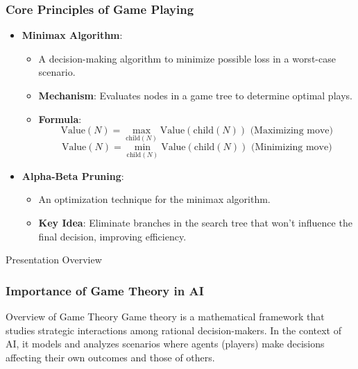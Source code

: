 \documentclass[aspectratio=169]{beamer}
\begin{document}
\begin{frame}[fragile]
    \frametitle{Core Principles of Game Playing}
    \begin{itemize}
        \item \textbf{Minimax Algorithm}:
            \begin{itemize}
                \item A decision-making algorithm to minimize possible loss in a worst-case scenario.
                \item \textbf{Mechanism}: Evaluates nodes in a game tree to determine optimal plays.
                \item \textbf{Formula}:
                \begin{equation}
                \text{Value}(N) = \max_{\text{child}(N)} \text{Value}(\text{child}(N)) \text{ (Maximizing move)}
                \end{equation}
                \begin{equation}
                \text{Value}(N) = \min_{\text{child}(N)} \text{Value}(\text{child}(N)) \text{ (Minimizing move)}
                \end{equation}
            \end{itemize}
        \item \textbf{Alpha-Beta Pruning}:
            \begin{itemize}
                \item An optimization technique for the minimax algorithm.
                \item \textbf{Key Idea}: Eliminate branches in the search tree that won't influence the final decision, improving efficiency.
            \end{itemize}
    \end{itemize}
\end{frame}

\begin{frame}{Presentation Overview}
  \tableofcontents[hideallsubsections]
\end{frame}

\begin{frame}[fragile]
    \frametitle{Importance of Game Theory in AI}
    \begin{block}{Overview of Game Theory}
        Game theory is a mathematical framework that studies strategic interactions among rational decision-makers. In the context of AI, it models and analyzes scenarios where agents (players) make decisions affecting their own outcomes and those of others.
    \end{block}
\end{frame}
\end{document}

